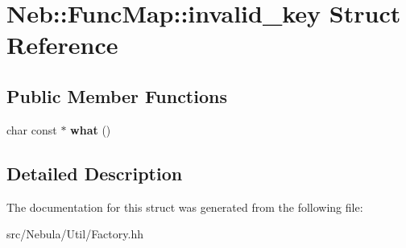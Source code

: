 \hypertarget{structNeb_1_1FuncMap_1_1invalid__key}{\section{\-Neb\-:\-:\-Func\-Map\-:\-:invalid\-\_\-key \-Struct \-Reference}
\label{structNeb_1_1FuncMap_1_1invalid__key}
}
\subsection*{\-Public \-Member \-Functions}
\begin{DoxyCompactItemize}
\item 
\hypertarget{structNeb_1_1FuncMap_1_1invalid__key_a2ad3f4a1a0e503a602a13ddd5fd30f57}{char const $\ast$ {\bfseries what} ()}\label{structNeb_1_1FuncMap_1_1invalid__key_a2ad3f4a1a0e503a602a13ddd5fd30f57}

\end{DoxyCompactItemize}


\subsection{\-Detailed \-Description}


\-The documentation for this struct was generated from the following file\-:\begin{DoxyCompactItemize}
\item 
src/\-Nebula/\-Util/\-Factory.\-hh\end{DoxyCompactItemize}
